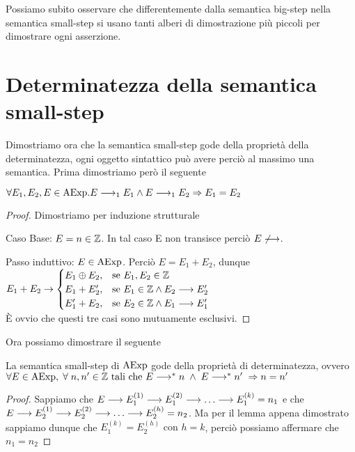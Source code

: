 Possiamo subito osservare che differentemente dalla semantica big-step
nella semantica small-step si usano tanti alberi di dimostrazione più piccoli per dimostrare
ogni asserzione. 

\section{Determinatezza della semantica small-step} 
Dimostriamo ora che la semantica small-step gode della proprietà della determinatezza, ogni oggetto sintattico può avere perciò al massimo una semantica. Prima dimostriamo però il seguente

\begin{teorema}
$\forall E_1, E_2, E \in \mathrm{AExp} . E \longrightarrow _1 E_1 \land E \longrightarrow _1 E_2 \Rightarrow E_1 = E_2 $
\end{teorema}

\begin{proof}
	 Dimostriamo per induzione strutturale
  
Caso Base: $E = n \in \mathbb{Z}$.
In tal caso E non transisce perciò $E \not \longrightarrow$.
  
Passo induttivo: $E \in \mathrm{AExp}$.
Perciò $E = E_1 + E_2$, dunque\\
$E_1 + E_2 \rightarrow \begin{cases} E_1 \oplus E_2, & \text{se }E_1, E_2 \in \mathbb{Z} \\
E_1 + E_2', & \text{se }E_1 \in \mathbb{Z} \land E_2 \longrightarrow E_2' \\
E_1' + E_2, & \text{se }E_2 \in \mathbb{Z} \land E_1 \longrightarrow E_1' \end{cases}$\\

È ovvio che questi tre casi sono mutuamente esclusivi.
\end{proof}

Ora possiamo dimostrare il seguente

\begin{teorema}[Determinatezza]
La semantica small-step di $\mathrm{AExp}$ gode della proprietà di determinatezza, ovvero
$\forall E \in \mathrm{AExp}, \; \forall \; n, n' \in \mathbb{Z} \text{ tali che } E \longrightarrow ^* n \; \land \; E \longrightarrow ^* n' \; \Rightarrow n = n'$
\end{teorema}

\begin{proof}
Sappiamo che $E \ssarrow E_1^{(1)} \ssarrow E_1^{(2)} \ssarrow \dots \ssarrow E_1^{(k)} = n_1$ e che $E \ssarrow E_2^{(1)} \ssarrow E_2^{(2)} \ssarrow \dots \ssarrow E_2^{(h)} = n_2$.
Ma per il lemma appena dimostrato sappiamo dunque che $E_1^{(k)} = E_2^{(h)} \text{ con } h = k$, perciò possiamo affermare che $n_1 = n_2$
\end{proof}

